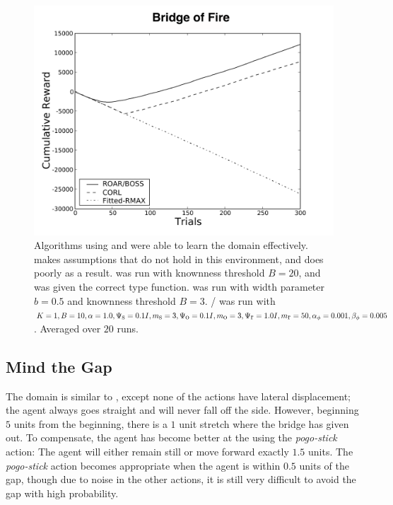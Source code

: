 \begin{figure}[t]
\vskip 0.2in
\begin{center}
\centerline{\includegraphics[width=\columnwidth]{bridgeFigure}}
\caption{Algorithms using  and  were able to learn the  domain effectively.  makes assumptions that do not hold in this environment, and does poorly as a result.  was run with knownness threshold $B=20$, and was given the correct type function.  was run with width parameter $b=0.5$ and knownness threshold $B=3$. / was run with $K=1, B=10, \alpha=1.0,\Psi_{\mbox s}=0.1I, m_{\mbox s}=3, \Psi_{\mbox o}=0.1I, m_{\mbox o}=3, \Psi_{\mbox r}=1.0I,m_{\mbox r}=50,\alpha_\phi=0.001,\beta_\phi=0.005$. Averaged over $20$ runs.}
\label{fig:bridge}
\end{center}
\vskip -0.2in
\end{figure} 

\subsection{Mind the Gap}
\label{gap}

The  domain is similar to , except none of the actions have lateral displacement; the agent always goes straight and will never fall off the side. However, beginning $5$ units from the beginning, there is a $1$ unit stretch where the bridge has given out. To compensate, the agent has become better at the using the \emph{pogo-stick} action: The agent will either remain still or move forward exactly $1.5$ units. The \emph{pogo-stick} action becomes appropriate when the agent is within $0.5$ units of the gap, though due to noise in the other actions, it is still very difficult to avoid the gap with high probability.

